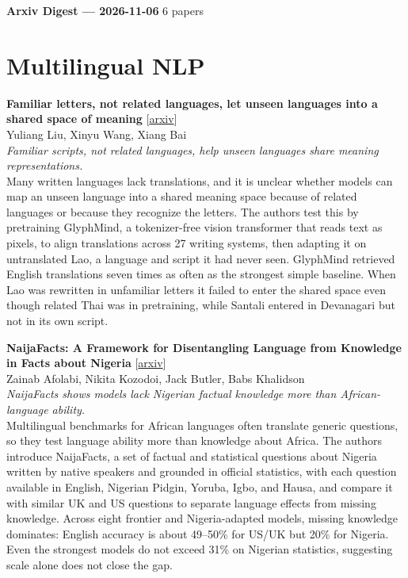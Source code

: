 \documentclass[12pt,letterpaper]{article}
\begin{document}
{\footnotesize\textbf{Arxiv Digest --- 2026-11-06} \hfill 6 papers}

\smallskip
\section*{Multilingual NLP}
\begin{minipage}{\linewidth}
{\small\textbf{Familiar letters, not related languages, let unseen languages into a shared space of meaning}} {\scriptsize[\href{https://arxiv.org/abs/2611.06006}{arxiv}]}\\
{\scriptsize Yuliang Liu, Xinyu Wang, Xiang Bai}\\
{\footnotesize\textit{Familiar scripts, not related languages, help unseen languages share meaning representations.}}\\[2pt]
{\footnotesize Many written languages lack translations, and it is unclear whether models can map an unseen language into a shared meaning space because of related languages or because they recognize the letters. The authors test this by pretraining GlyphMind, a tokenizer-free vision transformer that reads text as pixels, to align translations across 27 writing systems, then adapting it on untranslated Lao, a language and script it had never seen. GlyphMind retrieved English translations seven times as often as the strongest simple baseline. When Lao was rewritten in unfamiliar letters it failed to enter the shared space even though related Thai was in pretraining, while Santali entered in Devanagari but not in its own script.}
\end{minipage}

\medskip
\begin{minipage}{\linewidth}
{\small\textbf{NaijaFacts: A Framework for Disentangling Language from Knowledge in Facts about Nigeria}} {\scriptsize[\href{https://arxiv.org/abs/2611.06504}{arxiv}]}\\
{\scriptsize Zainab Afolabi, Nikita Kozodoi, Jack Butler, Babs Khalidson}\\
{\footnotesize\textit{NaijaFacts shows models lack Nigerian factual knowledge more than African-language ability.}}\\[2pt]
{\footnotesize Multilingual benchmarks for African languages often translate generic questions, so they test language ability more than knowledge about Africa. The authors introduce NaijaFacts, a set of factual and statistical questions about Nigeria written by native speakers and grounded in official statistics, with each question available in English, Nigerian Pidgin, Yoruba, Igbo, and Hausa, and compare it with similar UK and US questions to separate language effects from missing knowledge. Across eight frontier and Nigeria-adapted models, missing knowledge dominates: English accuracy is about 49--50\% for US/UK but 20\% for Nigeria. Even the strongest models do not exceed 31\% on Nigerian statistics, suggesting scale alone does not close the gap.}
\end{minipage}
\end{document}
